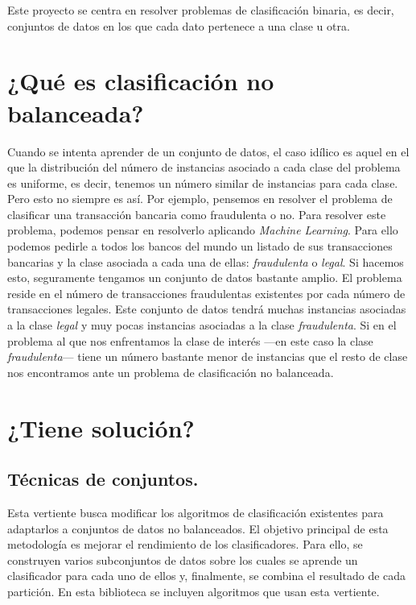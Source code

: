 Este proyecto se centra en resolver problemas de clasificación binaria, es decir, conjuntos de datos en los que cada dato pertenece a una clase u otra.

\section{¿Qué es clasificación no balanceada?} \label{sec:clasificacionnobalanceada}

Cuando se intenta aprender de un conjunto de datos, el caso idílico es aquel en el que la distribución del número de instancias asociado a cada clase del problema es uniforme, es decir, tenemos un número similar de instancias para cada clase. Pero esto no siempre es así. Por ejemplo, pensemos en resolver el problema de clasificar una transacción bancaria como fraudulenta o no. Para resolver este problema, podemos pensar en resolverlo aplicando \textit{Machine Learning}. Para ello podemos pedirle a todos los bancos del mundo un listado de sus transacciones bancarias y la clase asociada a cada una de ellas: \textit{fraudulenta} o \textit{legal}. Si hacemos esto, seguramente tengamos un conjunto de datos bastante amplio. El problema reside en el número de transacciones fraudulentas existentes por cada número de transacciones legales. Este conjunto de datos tendrá muchas instancias asociadas a la clase \textit{legal} y muy pocas instancias asociadas a la clase \textit{fraudulenta}. Si en el problema al que nos enfrentamos la clase de interés —en este caso la clase \textit{fraudulenta}— tiene un número bastante menor de instancias que el resto de clase nos encontramos ante un problema de clasificación no balanceada.

\section{¿Tiene solución?} \label{sec:solucionnobalanceada}

\subsection{Técnicas de conjuntos.} \label{subsec:algorithmlevel}

Esta vertiente busca modificar los algoritmos de clasificación existentes para adaptarlos a conjuntos de datos no balanceados. El objetivo principal de esta metodología es mejorar el rendimiento de los clasificadores. Para ello, se construyen varios subconjuntos de datos sobre los cuales se aprende un clasificador para cada uno de ellos y, finalmente, se combina el resultado de cada partición. En esta biblioteca se incluyen algoritmos que usan esta vertiente.

